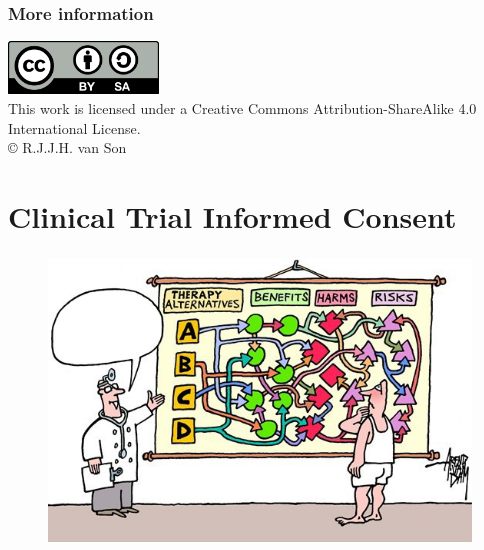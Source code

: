\documentclass[xcolor=dvipsnames]{beamer}
\newcommand{\YEAR}{\the\year}
\begin{document}
\begin{frame}[allowframebreaks]
        \frametitle{More information}

\begin{scriptsize}

\end{scriptsize}

\vskip 0.5cm
\begin{center}
\includegraphics[width=0.3\textwidth]{Pictures/CC-share-alike}\\
{\small This work is licensed under a Creative Commons Attribution-ShareAlike 4.0 International License.}\\
\copyright {\YEAR}  R.J.J.H. van Son
\end{center}

\end{frame}

\appendix

\section{Clinical Trial Informed Consent}

\begin{frame}[label=Clinical Trial Informed Consent]
	\frametitle{\insertsection}
	
	\begin{center}
	\begin{figure}
	{\includegraphics[height=0.80\textheight]{Pictures/InformedConsent}}
	\end{figure}
	\end{center}
\end{frame}
\end{document}

